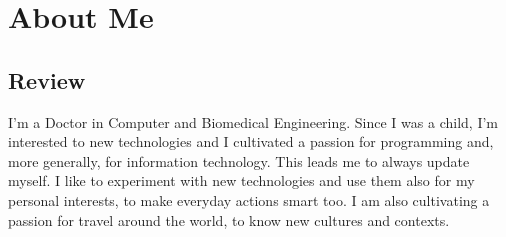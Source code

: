 \documentclass[letterpaper]{twentysecondcv} %
\begin{document}





\sskills{}


\makeprofile %


\section{About Me}

\subsection{Review}
I'm a Doctor in Computer and Biomedical Engineering. Since I was a child, I'm interested to new technologies and I cultivated a passion for programming and, more generally, for information technology. \newline
This leads me to always update myself. I like to experiment with new technologies and use them also for my personal interests, to make everyday actions smart too. \newline 
I am also cultivating a passion for travel around the world, to know new cultures and contexts.

\end{document}
